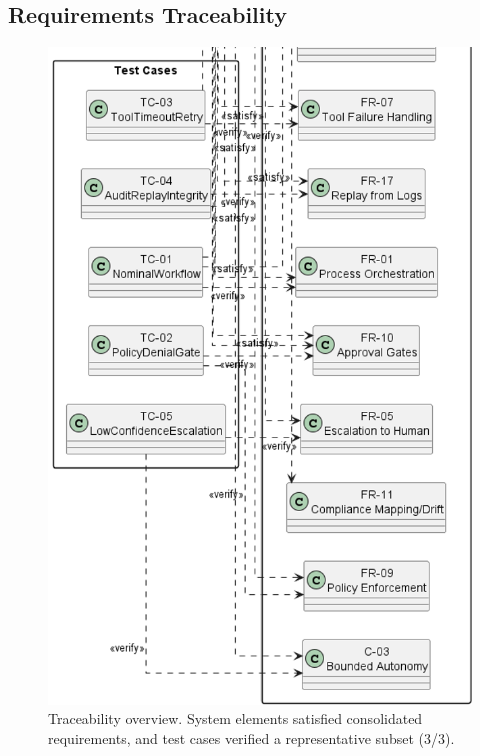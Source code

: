 \subsection{Requirements Traceability}\label{app:trace}
\begin{figure}[htbp]
  \centering
  \includegraphics[width=0.6\linewidth]{ressources/MAS/diagrams/MASTraceability3.png}
  \caption{Traceability overview. System elements satisfied consolidated requirements, and test cases verified a representative subset (3/3).}
  \label{fig:app-mas-traceability}
\end{figure}

\clearpage



\clearpage
